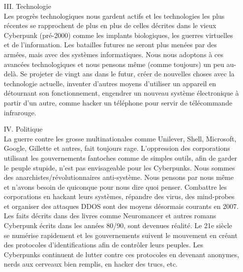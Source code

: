 \documentclass[11pt,twoside,a4paper]{book}
\begin{document}
\begin{enumerate}
		Les Cyberpunks refusent d'{\^e}tre du b{\'e}tail, de prendre le train en marche, de faire partie des spectateurs, ils discernent les artifices du monde moderne et les combattent. Les Cyberpunks sont ceux assez courageux pour d{\'e}livrer leur message, debout devant la foule, le gouvernement, l'{\'e}glise et l'industrie et proclamer "Vous vous trompez !". Ils acceptent l'ostracisme, car ils ont d{\'e}j{\`a} rejet{\'e} la fa\c{c}on dont la "soci{\'e}t{\'e}" esp{\`e}re une am{\'e}lioration. C'est parfois une lutte solitaire, mais les Cyberpunks font pratiquement partie de toutes les soci{\'e}t{\'e}s, tous les pays, et quand ils se rassemblent, ils sont une force {\`a} laquelle ils doivent faire face.
	\item[III.] Technologie ~\\
		Les progr{\`e}s technologiques nous gardent actifs et les technologies les plus r{\'e}centes se rapprochent de plus en plus de celles d{\'e}crites dans le vieux Cyberpunk (pr{\'e}-2000) comme les implants biologiques, les guerres virtuelles et de l'information. Les batailles futures ne seront plus men{\'e}es par des arm{\'e}es, mais avec des syst{\`e}mes informatiques. Nous nous adoptons {\`a} ces avanc{\'e}es technologiques et nous pensons m{\^e}me (comme toujours) un peu au-del{\`a}. Se projeter de vingt ans dans le futur, cr{\'e}er de nouvelles choses avec la technologie actuelle, inventer d'autres moyens d'utiliser un appareil en d{\'e}tournant son fonctionnement, engendrer un nouveau syst{\`e}me {\'e}lectronique {\`a} partir d'un autre, comme hacker un t{\'e}l{\'e}phone pour servir de t{\'e}l{\'e}commande infrarouge.
	\item[IV.] Politique ~\\
		La guerre contre les grosse multinationales comme Unilever, Shell, Microsoft, Google, Gillette et autres, fait toujours rage. L'oppression des corporations utilisant les gouvernements fantoches comme de simples outils, afin de garder le peuple stupide, n'est pas envisageable pour les Cyberpunks. Nous sommes des anarchistes/r{\'e}volutionnaires anti-syst{\`e}me. Nous pensons par nous m{\^e}me et n'avons besoin de quiconque pour nous dire quoi penser. Combattre les corporations en hackant leurs syst{\`e}mes, r{\'e}pandre des virus, des mind-probes et organiser des attaques DDOS sont des moyens d{\'e}sormais courants en 2007. Les faits d{\'e}crits dans des livres comme Neuromancer et autres romans Cyberpunk {\'e}crits dans les ann{\'e}es 80/90, sont devenues r{\'e}alit{\'e}. Le 21e si{\`e}cle se num{\'e}rise rapidement et les gouvernements suivent le mouvement en cr{\'e}ant des protocoles d'identifications afin de contr{\^o}ler leurs peuples. Les Cyberpunks continuent de lutter contre ces protocoles en devenant anonymes, nerds aux cerveaux bien remplis, en hacker des trucs, etc.

\end{enumerate}
\end{document}
